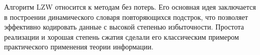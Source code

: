 Алгоритм LZW относится к методам без потерь. Его основная идея заключается в построении динамического словаря повторяющихся подстрок, что позволяет эффективно кодировать данные с высокой степенью избыточности. Простота реализации и хорошая степень сжатия сделали его классическим примером практического применения теории информации.
